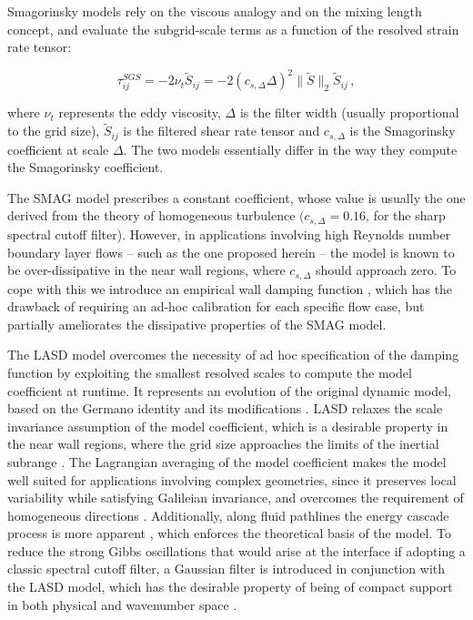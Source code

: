 Smagorinsky models rely on the viscous analogy and on the mixing length concept, and evaluate the subgrid-scale terms as a function of the resolved strain rate tensor: 
%
\begin{linenomath*}
\begin{equation}
  \tau_{ij}^{SGS} = - 2 \nu_t \tilde{S}_{ij} = -2  (c_{s,\Delta} \Delta)^2 \| \tilde{S} \|_2 \tilde{S}_{ij} \, ,
    \label{statSmag}
\end{equation}
\end{linenomath*}
%
where $\nu_t$ represents the eddy viscosity, $\Delta$ is the filter width (usually proportional to the grid size), $\tilde{S}_{ij}$ is the filtered shear rate tensor and $c_{s,\Delta}$ is the Smagorinsky coefficient at scale $\Delta$.
The two models essentially differ in the way they compute the Smagorinsky coefficient.

The SMAG model prescribes a constant coefficient, whose value is usually the one derived from the theory of homogeneous turbulence $(c_{s,\Delta}=0.16$, for the sharp spectral cutoff filter).
However, in applications involving high Reynolds number boundary layer flows -- such as the one proposed herein -- the model is known to be over-dissipative in the near wall regions,  where $c_{s,\Delta}$ should approach zero. To cope with this we introduce an empirical wall damping function \citep{Mason2006}, which has the drawback of requiring an ad-hoc calibration for each specific flow case, but partially ameliorates the dissipative properties of the SMAG model.


The LASD model overcomes the necessity of ad hoc specification of the damping function by exploiting the smallest resolved scales to compute the model coefficient at runtime. It represents an evolution of the original dynamic model, based on the Germano identity \citep{Germano1991a} and its modifications \citep{Lilly1992}. 
LASD relaxes the scale invariance assumption of the model coefficient, which is a desirable property in the near wall regions, where the grid size approaches the limits of the inertial subrange \citep{Meneveau2000}.
The Lagrangian averaging of the model coefficient makes the model well suited for applications involving complex geometries, since it preserves local variability while satisfying Galileian invariance, and overcomes the requirement of homogeneous directions \citep{Bou-Zeid2005}. 
Additionally, along fluid pathlines the energy cascade process is more apparent \citep{Meneveau1994}, which enforces the theoretical basis of the model.
To reduce the strong Gibbs oscillations that would arise at the interface if adopting a classic spectral cutoff filter, a Gaussian filter is introduced in conjunction with the LASD model, which has the desirable property of being of compact support in both physical and wavenumber space \citep{Tseng2006}.


